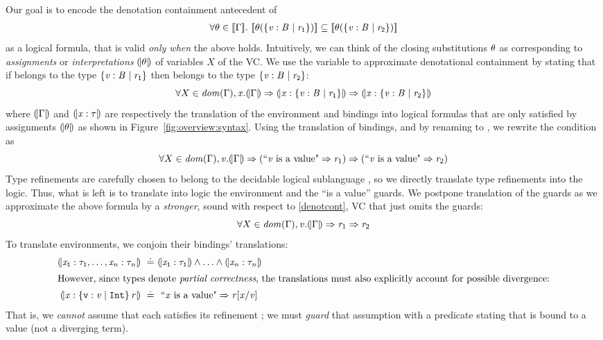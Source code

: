 Our goal is to encode the denotation containment antecedent of \rtdsub
%
\begin{align}\label{denotcont}
\forall \theta\in [\![\Gamma]\!].\  
  		 [\![\theta({\{ \mathtt{\mathit{v}}:\mathtt{\mathit{B}^{}} \mid \mathtt{\mathit{r}_1} \}})]\!] 
  		\subseteq   [\![\theta({\{ \mathtt{\mathit{v}}:\mathtt{\mathit{B}^{}} \mid \mathtt{\mathit{r}_2} \}})]\!]
\end{align}
as a logical formula, that is valid \emph{only when} the above holds.
Intuitively, we can think of the closing substitutions $\theta$ as 
corresponding to \emph{assignments} or \emph{interpretations} 
$(\!|\theta|\!)$ 
of variables $X$ of the VC.
%
We use the variable \x to approximate denotational containment 
by stating that  
if \x belongs to the type ${\{ \mathtt{\mathit{v}}:\mathtt{\mathit{B}^{}} \mid \mathtt{\mathit{r}_1} \}}$
then \x belongs to the type ${\{ \mathtt{\mathit{v}}:\mathtt{\mathit{B}^{}} \mid \mathtt{\mathit{r}_2} \}}$:
$$
\forall X \in \mathit{dom}(\Gamma), \mathit{x}. 
    (\!|\Gamma|\!)\Rightarrow 
  		 {\ensuremath{(\!|\mathtt{\mathit{x}}:\mathtt{{\{ \mathtt{\mathit{v}}:\mathtt{\mathit{B}^{}} \mid \mathtt{\mathit{r}_1} \}}}|\!)}} 
  		\Rightarrow (\!|\mathtt{\mathit{x}}:\mathtt{{\{ \mathtt{\mathit{v}}:\mathtt{\mathit{B}^{}} \mid \mathtt{\mathit{r}_2} \}}}|\!)
$$
where $(\!|\Gamma|\!)$ and $(\!|\mathtt{\mathit{x}}:\mathtt{\tau}|\!)$ are respectively the translation 
of the environment and bindings into logical formulas 
that are only satisfied by assignments $(\!|\theta|\!)$
as shown in Figure~\ref{fig:overview:syntax}.
%
Using the translation of bindings, 
and by renaming \x to \vv,
we rewrite the condition as
$$
\forall X \in \mathit{dom}(\Gamma), \mathit{v}. 
    (\!|\Gamma|\!)
    \Rightarrow
     ({\text{``}\mathit{v}\ \text{is a value"}}  \Rightarrow \mathit{r}_1)
    \Rightarrow
     ({\text{``}\mathit{v}\ \text{is a value"}}  \Rightarrow \mathit{r}_2)
$$
Type refinements are carefully chosen to belong to the 
decidable logical sublanguage \logiclang, so we directly translate
type refinements into the logic.
%
Thus, what is left is to translate into logic the environment and the ``is a value'' guards.
%
We postpone translation of the guards as we approximate the above formula by 
a \emph{stronger}, \ie sound with respect to \ref{denotcont},
VC that just omits the guards:
$$
\forall X \in \mathit{dom}(\Gamma), \mathit{v}. 
    (\!|\Gamma|\!)
    \Rightarrow
      \mathit{r}_1 \Rightarrow \mathit{r}_2
$$
%
To translate environments, we conjoin their bindings' translations:
\begin{align*}
%
\embed{\ttbind{\x_1}{\typ_1},\ldots,\ttbind{\x_\n}{\typ_\n}} \defeq & 
\embed{\ttbind{\x_1}{\typ_1}} \wedge \ldots \wedge \embed{\ttbind{\x_\n}{\typ_\n}} \\
%
\intertext{However, since types denote \emph{partial correctness},
   the translations must also explicitly account for possible divergence:}
\embed{\ttbind{\x}{\tlref{\vv}{\tint}{}{\refi}}} \defeq & \ \mbox{``$\x$ is a value"}  \Rightarrow \SUBST{\lref}{\vv}{\x}
\end{align*}
%
That is, we \emph{cannot} assume that each \x satisfies its 
refinement ; we must \emph{guard} that assumption with a 
predicate stating that \x is bound to a value (not a diverging term).

